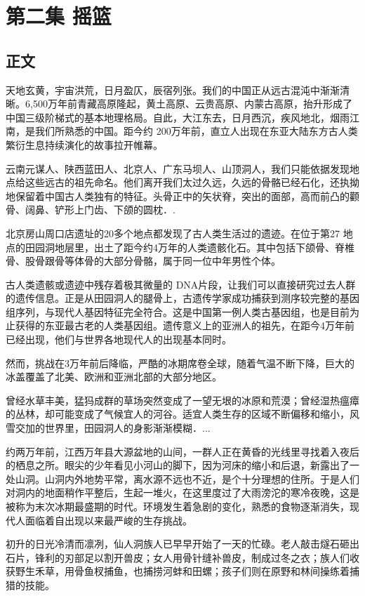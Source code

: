 \chapter{第二集 \quad 摇篮}

\section{正文}

天地玄黄，宇宙洪荒，日月盈仄，辰宿列张。我们的中国正从远古混沌中渐渐清晰。6,500万年前青藏高原隆起，黄土高原、云贵高原、内蒙古高原，抬升形成了中国三级阶梯式的基本地理格局。自此，大江东去，日月西沉，疾风地北，烟雨江南，是我们所熟悉的中国。距今约 200万年前，直立人出现在东亚大陆东方古人类繁衍生息持续演化的故事拉开帷幕。

云南元谋人、陕西蓝田人、北京人、广东马坝人、山顶洞人，我们只能依据发现地点给这些远古的祖先命名。他们离开我们太过久远，久远的骨骼已经石化，还执拗地保留着中国古人类独有的特征。头骨正中的矢状脊，突出的面部，高而前凸的颧骨、阔鼻、铲形上门齿、下颌的圆枕．.

北京房山周口店遗址的20多个地点都发现了古人类生活过的遗迹。在位于第27 地点的田园洞地层里，出土了距今约4万年的人类遗骸化石。其中包括下颌骨、脊椎骨、股骨跟骨等体骨的大部分骨骼，属于同一位中年男性个体。

古人类遗骸或遗迹中残存着极其微量的 DNA片段，让我们可以直接研究过去人群的遗传信息。正是从田园洞人的腿骨上，古遗传学家成功捕获到测序较完整的基因组序列，与现代人基因特征完全符合。这是中国第一例人类古基因组，也是目前为止获得的东亚最古老的人类基因组。遗传意义上的亚洲人的祖先，在距今4万年前已经出现，他们与世界各地现代人的出现基本同时。

然而，挑战在3万年前后降临，严酷的冰期席卷全球，随着气温不断下降，巨大的冰盖覆盖了北美、欧洲和亚洲北部的大部分地区。

曾经水草丰美，猛犸成群的草场突然变成了一望无垠的冰原和荒漠；曾经湿热瘟瘴的丛林，却可能变成了气候宜人的河谷。适宜人类生存的区域不断偏移和缩小，风雪交加的世界里，田园洞人的身影渐渐模糊．...

约两万年前，江西万年县大源盆地的山间，一群人正在黄昏的光线里寻找着入夜后的栖息之所。眼尖的少年看见小河山的脚下，因为河床的缩小和后退，新露出了一处山洞。山洞内外地势平常，离水源不远也不近，是个十分理想的住所。于是人们对洞内的地面稍作平整后，生起一堆火，在这里度过了大雨滂沱的寒冷夜晚，这是被称为末次冰期最盛期的时代。环境发生着急剧的变化，熟悉的食物逐渐消失，现代人面临着自出现以来最严峻的生存挑战。

初升的日光冷清而凛冽，仙人洞族人已早早开始了一天的忙碌。老人敲击燧石砸出石片，锋利的刃部足以割开兽皮；女人用骨针缝补兽皮，制成过冬之衣；族人们收获野生禾草，用骨鱼杈捕鱼，也捕捞河蚌和田螺；孩子们则在原野和林间操练着捕猎的技能。

